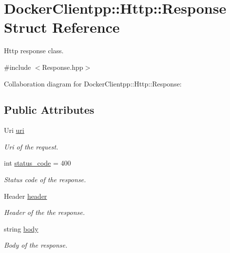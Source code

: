\hypertarget{structDockerClientpp_1_1Http_1_1Response}{}\section{Docker\+Clientpp\+::Http\+::Response Struct Reference}
\label{structDockerClientpp_1_1Http_1_1Response}


Http response class.  




{\ttfamily \#include $<$Response.\+hpp$>$}



Collaboration diagram for Docker\+Clientpp\+::Http\+::Response\+:
\subsection*{Public Attributes}
\begin{DoxyCompactItemize}
\item 
\mbox{\label{structDockerClientpp_1_1Http_1_1Response_a02b2ca36fd217ba3c002872d00153004}} 
Uri \mbox{\hyperlink{structDockerClientpp_1_1Http_1_1Response_a02b2ca36fd217ba3c002872d00153004}{uri}}
\begin{DoxyCompactList}\small\item\em Uri of the request. \end{DoxyCompactList}\item 
\mbox{\label{structDockerClientpp_1_1Http_1_1Response_a8a5a8e1bd8d292f597c641538c9f1a1a}} 
int \mbox{\hyperlink{structDockerClientpp_1_1Http_1_1Response_a8a5a8e1bd8d292f597c641538c9f1a1a}{status\+\_\+code}} = 400
\begin{DoxyCompactList}\small\item\em Status code of the response. \end{DoxyCompactList}\item 
\mbox{\label{structDockerClientpp_1_1Http_1_1Response_a27d3d0dcf4555b6fb34c3a0b2a525797}} 
Header \mbox{\hyperlink{structDockerClientpp_1_1Http_1_1Response_a27d3d0dcf4555b6fb34c3a0b2a525797}{header}}
\begin{DoxyCompactList}\small\item\em Header of the the response. \end{DoxyCompactList}\item 
\mbox{\label{structDockerClientpp_1_1Http_1_1Response_a23d457fc616f258132c980f75d5791ad}} 
string \mbox{\hyperlink{structDockerClientpp_1_1Http_1_1Response_a23d457fc616f258132c980f75d5791ad}{body}}
\begin{DoxyCompactList}\small\item\em Body of the response. \end{DoxyCompactList}\end{DoxyCompactItemize}


